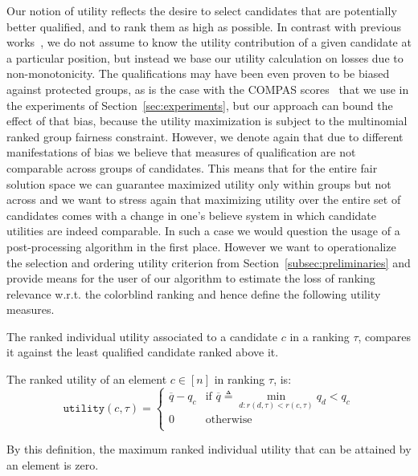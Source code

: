Our notion of utility reflects the desire to select candidates that are potentially better qualified, and to rank them as high as possible.
%
In contrast with previous works~\cite{yang2016measuring,celis2017ranking}, we do not assume to know the utility contribution of a given candidate at a particular position, but instead we base our utility calculation on losses due to non-monotonicity.
%
The qualifications may have been even proven to be biased against protected groups, as is the case with the COMPAS scores~\cite{angwin_2016_machine} that we use in the experiments of Section~\ref{sec:experiments}, but our approach can bound the effect of that bias, because the utility maximization is subject to the multinomial ranked group fairness constraint.
%
However, we denote again that due to different manifestations of bias we believe that measures of qualification are not comparable across groups of candidates.
%
This means that for the entire fair solution space we can guarantee maximized utility only within groups but not across and we want to stress again that maximizing utility over the entire set of candidates comes with a change in one's believe system in which candidate utilities are indeed comparable.
%
In such a case we would question the usage of a post-processing algorithm in the first place.
%
However we want to operationalize the selection and ordering utility criterion from Section~\ref{subsec:preliminaries} and provide means for the user of our algorithm to estimate the loss of ranking relevance w.r.t. the colorblind ranking and hence define the following utility measures.

The ranked individual utility associated to a candidate $c$ in a ranking $\tau$, compares it against the least qualified candidate ranked above it.

\begin{definition}
	\label{def:rankedIndividualFairness}
	The ranked utility of an element $c \in [n]$ in ranking $\tau$, is:
	\[
	\texttt{utility}(c,\tau) = \begin{cases}
	\overline{q} - q_c & \textrm{if~} \overline{q} \triangleq \min_{d: r(d,\tau) < r(c,\tau)} q_d < q_c \\
	0 & \textrm{otherwise}\\
	\end{cases}
	\]
\end{definition}
%
\noindent By this definition, the maximum ranked individual utility that can be attained by an element is zero.
%

